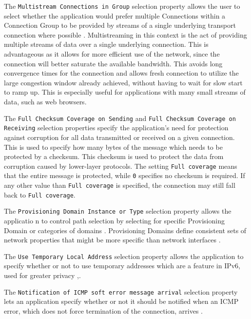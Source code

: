 The \texttt{Multistream Connections in Group} selection property
allows the user  to select whether the
application would prefer multiple Connections within a
Connection Group to be provided by streams of a single
underlying transport connection where possible
\cite{paulyArchitectureRequirementsTransport2025}.
Multistreaming in this context is the act of providing multiple
streams of data over a single underlying connection. This is
advantageous as it allows for more efficient use of the network,
since the connection will better saturate the available
bandwidth. This avoids long convergence times for the connection
and allows fresh connection to utilize the large congestion
window already achieved, without having to wait for slow start
to ramp up. This is especially useful for applications with many
small streams of data, such as web browsers.

The \texttt{Full Checksum Coverage on Sending} and \texttt{Full
	Checksum Coverage on Re\-ceiving} selection properties specify
the application's need for protection against corruption for all
data transmitted or received on a given connection. This is used
to specify how many bytes of the message which needs to be
protected by a checksum. This checksum is used to protect the
data from corruption caused by lower-layer protocols. The
setting \texttt{Full coverage} means that the entire message is
protected, while \texttt{0} specifies no checksum is required.
If any other value than \texttt{Full coverage} is specified, the
connection may still fall back to \texttt{Full coverage}.

The \texttt{Provisioning Domain Instance or Type} selection
property allows the applicatio n
to control path selection by selecting for specific Provisioning
Domain or categories of domains
\cite{paulyArchitectureRequirementsTransport2025}. Provisioning
Domains define consistent sets of network properties that might
be more specific than network interfaces
\cite{paulyArchitectureRequirementsTransport2025}.

The \texttt{Use Temporary Local Address} selection property
allows the application  to specify
whether or not to use temporary addresses which are a feature in
IPv6, used for greater privacy
\cite{gontTemporaryAddressExtensions2021},\cite{paulyArchitectureRequirementsTransport2025}.

The \texttt{Notification of ICMP soft error message arrival}
selection property lets an application  specify whether or not it should be notified when an ICMP
error, which does not force termination of the connection,
arrives \cite{paulyArchitectureRequirementsTransport2025}.

